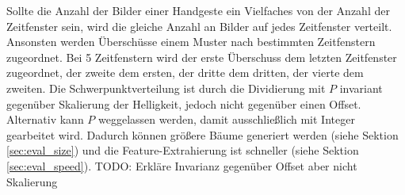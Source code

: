 Sollte die Anzahl der Bilder einer Handgeste ein Vielfaches von der Anzahl der Zeitfenster sein, wird die gleiche Anzahl an Bilder auf jedes Zeitfenster verteilt. Ansonsten werden Überschüsse einem Muster
nach bestimmten Zeitfenstern zugeordnet. Bei 5 Zeitfenstern wird der erste Überschuss dem letzten Zeitfenster zugeordnet, der zweite dem ersten, der dritte dem dritten, der vierte dem zweiten.
\newline
\newline
Die Schwerpunktverteilung ist durch die Dividierung mit $P$ invariant gegenüber Skalierung der Helligkeit, jedoch nicht gegenüber einen Offset. Alternativ kann $P$ weggelassen werden, damit ausschließlich
mit Integer gearbeitet wird. Dadurch können größere Bäume generiert werden (siehe Sektion \ref{sec:eval_size}) und die Feature-Extrahierung ist schneller (siehe Sektion \ref{sec:eval_speed}).
\newline
\newline
TODO: Erkläre Invarianz gegenüber Offset aber nicht Skalierung
